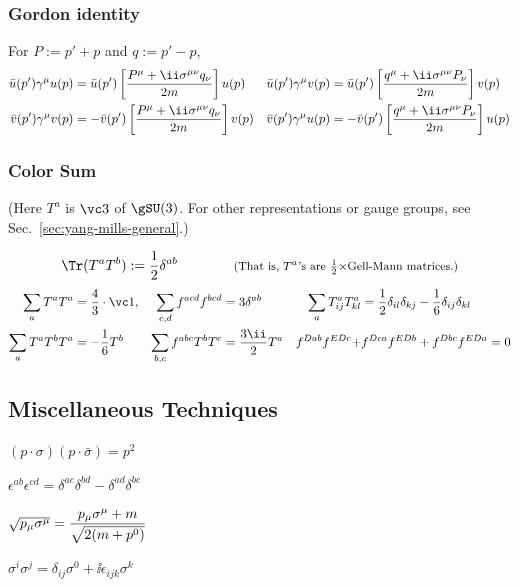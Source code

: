 \subsubsection{Gordon identity}
For  $P:=p'+p$ and $q:=p'-p$,
\begin{align}
 \bar u(p')\Gm u(p) &=  \bar u(p') \left[\frac{P^\mu + \ii\Smn q_\nu}{2m}\right] u(p)&
 \bar u(p')\Gm v(p) &=  \bar u(p') \left[\frac{q^\mu + \ii\Smn P_\nu}{2m}\right] v(p)\\
 \bar v(p')\Gm v(p) &= -\bar v(p') \left[\frac{P^\mu + \ii\Smn q_\nu}{2m}\right] v(p)&
 \bar v(p')\Gm u(p) &= -\bar v(p') \left[\frac{q^\mu + \ii\Smn P_\nu}{2m}\right] u(p)
\end{align}

\subsubsection{Color Sum}
\vspace{-20pt}
\begin{flushright}
{\footnotesize (Here $T^a$ is $\vc 3$ of $\gSU(3)$. For other representations or gauge groups, see Sec.~\ref{sec:yang-mills-general}.)}
\end{flushright}\vskip-10pt
\begin{equation}
  \Tr(T^aT^b):=\frac12\delta^{ab}\qquad\qquad \text{\footnotesize (That is, $T^a$'s are $\tfrac12\times$Gell-Mann matrices.)}
\end{equation}\vskip-20pt
\begin{align}
\sum_a T^aT^a    &= \frac43\cdot\vc 1, &
\sum_{c,d} f^{acd}f^{bcd} &= 3\delta^{ab}&
\sum_a T^a_{ij}T^a_{kl}   &= \frac12{\delta_{il}\delta_{kj}} - \frac16{\delta_{ij}\delta_{kl}}\\
\sum_a T^aT^bT^a &= -\frac16T^b &
\sum_{b,c} f^{abc}T^bT^c  &= \frac{3\ii}{2}T^a&
 f^{Dab}f^{EDc}+&f^{Dca}f^{EDb}+f^{Dbc}f^{EDa}=0
\end{align}

\vspace{50pt}


\subsection{Miscellaneous Techniques}
$(p\cdot\sigma)(p\cdot\bar\sigma)=p^2$

$\epsilon^{ab}\epsilon^{cd}=\delta^{ac}\delta^{bd}-\delta^{ad}\delta^{bc}$

$\sqrt{p_\mu\sigma^\mu}=\dfrac{p_\mu\sigma^\mu+m}{\sqrt{2(m+p^0)}}$

$\sigma^i\sigma^j=\delta_{ij}\sigma^0+\ii\epsilon_{ijk}\sigma^k$

